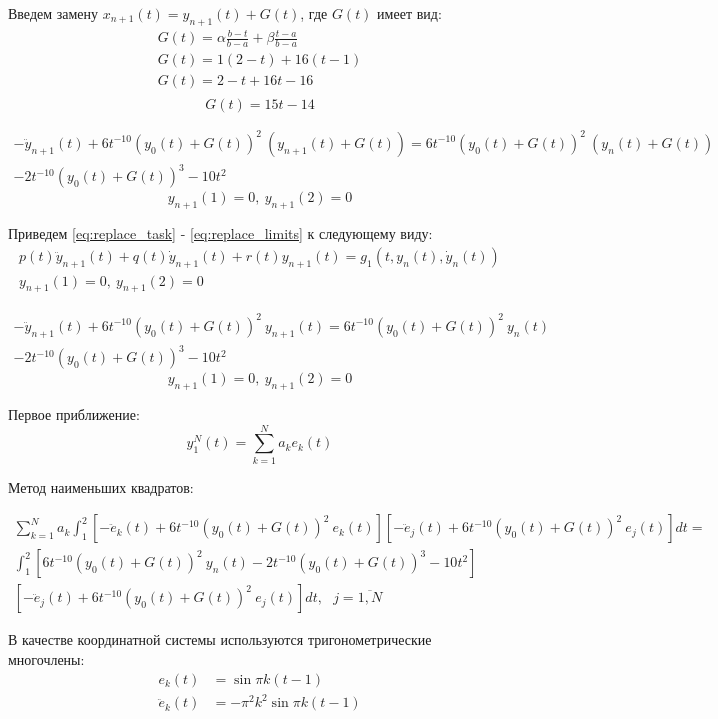 \documentclass[12pt]{article}
\begin{document}
Введем замену $x_{n+1}(t) = y_{n+1}(t) + G(t)$, где $G(t)$ имеет вид:
\begin{gather*}
	G(t) = \alpha \frac{b-t}{b-a} + \beta \frac{t-a}{b-a} \\
	G(t) = 1 (2-t) + 16 (t-1) \\
	G(t) = 2-t + 16t-16 \\
\end{gather*}
\begin{equation}
	G(t) = 15t - 14
\end{equation}

\begin{multline} \label{eq:replace_task}
    -\ddot{y}_{n+1}(t) + 6t^{-10}(y_0(t) + G(t))^2\ (y_{n+1}(t) + G(t)) =
     6t^{-10}(y_0(t) + G(t))^2\ (y_n(t) + G(t)) \\
     - 2t^{-10}(y_0(t) + G(t))^3 - 10t^2
\end{multline}
\begin{equation} \label{eq:replace_limits}
    y_{n+1}(1)=0,\ y_{n+1}(2)=0
\end{equation}

Приведем \eqref{eq:replace_task} - \eqref{eq:replace_limits} к следующему виду:
\begin{gather}
    p(t)\ddot{y}_{n+1}(t) + q(t)\dot{y}_{n+1}(t) + r(t)y_{n+1}(t) = g_1(t, y_n(t), \dot{y}_n(t)) \\
    y_{n+1}(1) = 0,\ y_{n+1}(2) = 0
\end{gather}

\begin{multline}
    -\ddot{y}_{n+1}(t) + 6t^{-10}(y_0(t) + G(t))^2\ y_{n+1}(t) =
    6t^{-10}(y_0(t) + G(t))^2\ y_n(t) \\
    - 2t^{-10}(y_0(t) + G(t))^3 - 10t^2
\end{multline}
\begin{equation}
    y_{n+1}(1) = 0,\ y_{n+1}(2) = 0
\end{equation}

Первое приближение:
\begin{equation}
    y_1^N(t) = \sum_{k = 1}^{N}a_ke_k(t)
\end{equation}

Метод наименьших квадратов:

\newcommand{\gone}{\ensuremath{6t^{-10}(y_0(t)+G(t))^2\ y_n(t) - 2t^{-10}(y_0(t)+G(t))^3 - 10t^2}}
\newcommand{\operator}[1]{\ensuremath{-\ddot{e}_#1(t) + 6t^{-10}(y_0(t) + G(t))^2\ e_#1(t)}}

\begin{multline} \label{lsm}
    \sum_{k = 1}^{N}a_k
    \int_1^2 [\operator{k}][\operator{j}]dt = \\
    \int_1^2 [\gone] \\ [\operator{j}]dt,\ \ \
    j = \overline{1,N}
\end{multline}

В качестве координатной системы используются тригонометрические многочлены:
\begin{equation}
    \begin{split}
        e_k(t) &= \sin{\pi k (t - 1)} \\
        \ddot{e}_k(t)&= -\pi^2 k^2\sin{\pi k(t-1)}
    \end{split}
\end{equation}
\end{document}
